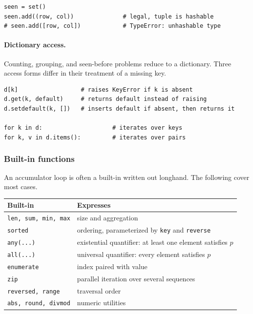 \begin{lstlisting}[style=python, caption={Tuple as a composite key}]
seen = set()
seen.add((row, col))              # legal, tuple is hashable
# seen.add([row, col])            # TypeError: unhashable type
\end{lstlisting}

\paragraph{Dictionary access.} Counting, grouping, and seen-before problems
reduce to a dictionary. Three access forms differ in their treatment of a
missing key.

\begin{lstlisting}[style=python, caption={Dictionary access}]
d[k]                  # raises KeyError if k is absent
d.get(k, default)     # returns default instead of raising
d.setdefault(k, [])   # inserts default if absent, then returns it

for k in d:                    # iterates over keys
for k, v in d.items():         # iterates over pairs
\end{lstlisting}

\newpage
\subsubsection*{Built-in functions}

An accumulator loop is often a built-in written out longhand. The following
cover most cases.

\begin{center}
\begin{tabular}{ll}
\toprule
\textbf{Built-in} & \textbf{Expresses} \\
\midrule
\texttt{len, sum, min, max} & size and aggregation \\
\texttt{sorted} & ordering, parameterized by \texttt{key} and \texttt{reverse} \\
\texttt{any(...)} & existential quantifier: at least one element satisfies $p$ \\
\texttt{all(...)} & universal quantifier: every element satisfies $p$ \\
\texttt{enumerate} & index paired with value \\
\texttt{zip} & parallel iteration over several sequences \\
\texttt{reversed, range} & traversal order \\
\texttt{abs, round, divmod} & numeric utilities \\
\bottomrule
\end{tabular}
\end{center}

